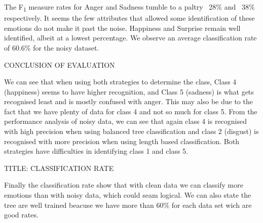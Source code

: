 

The F\textsubscript{1} measure rates for Anger and Sadness tumble to a paltry ~28\% and ~38\% respectively.
It seems the few attributes that allowed some identification of these emotions do not make it past the noise.
Happiness and Surprise remain well identified, albeit at a lowest percentage.
We observe an average classification rate of 60.6\% for the noisy dataset.


CONCLUSION OF EVALUATION

We can see that when using both strategies to determine the class, Class 4 (happiness) seems to have higher recognition, and Class 5 (sadness) is what gets recognised least and is mostly confused with anger. This may also be due to the fact that we have plenty of data for class 4 and not so much for class 5.
From the performance analysis of noisy data, we can see that again class 4 is recognised with high precision when using balanced tree classification and class 2 (disgust) is recognised with more precision when using length based classification. Both strategies have difficulties in identifying class 1 and class 5.

TITLE: CLASSIFICATION RATE

Finally the classification rate show that with clean data we can classify more emotions than with noisy data, which could seam logical. 
We can also state the tree are well trained beacuse we have more than 60\% for each data set wich are good rates. 




